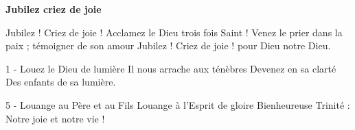 \textbf{Jubilez criez de joie}

Jubilez ! Criez de joie ! Acclamez le Dieu trois fois Saint ! Venez le prier dans la paix ; témoigner de son amour Jubilez ! Criez de joie ! pour Dieu notre Dieu.

1 - Louez le Dieu de lumière Il nous arrache aux ténèbres Devenez en sa clarté Des enfants de sa lumière.

5 - Louange au Père et au Fils Louange à l'Esprit de gloire Bienheureuse Trinité : Notre joie et notre vie !
